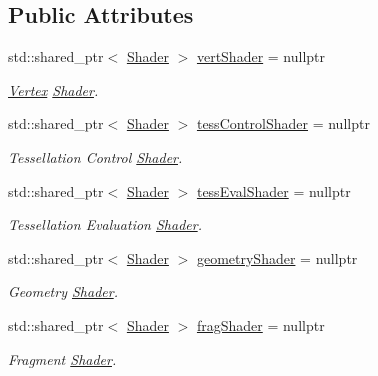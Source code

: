 \subsection*{Public Attributes}
\begin{DoxyCompactItemize}
\item 
\mbox{\label{struct_shader_set_a42e4d7883cc499b15fb6f9d93ec1ab30}} 
std\+::shared\+\_\+ptr$<$ \mbox{\hyperlink{class_shader}{Shader}} $>$ \mbox{\hyperlink{struct_shader_set_a42e4d7883cc499b15fb6f9d93ec1ab30}{vert\+Shader}} = nullptr
\begin{DoxyCompactList}\small\item\em \mbox{\hyperlink{struct_vertex}{Vertex}} \mbox{\hyperlink{class_shader}{Shader}}. \end{DoxyCompactList}\item 
\mbox{\label{struct_shader_set_ac92117d329dc06bc90c1d540dcbc9251}} 
std\+::shared\+\_\+ptr$<$ \mbox{\hyperlink{class_shader}{Shader}} $>$ \mbox{\hyperlink{struct_shader_set_ac92117d329dc06bc90c1d540dcbc9251}{tess\+Control\+Shader}} = nullptr
\begin{DoxyCompactList}\small\item\em Tessellation Control \mbox{\hyperlink{class_shader}{Shader}}. \end{DoxyCompactList}\item 
\mbox{\label{struct_shader_set_af05a7762f410cdc3faf5b443b1b4d74a}} 
std\+::shared\+\_\+ptr$<$ \mbox{\hyperlink{class_shader}{Shader}} $>$ \mbox{\hyperlink{struct_shader_set_af05a7762f410cdc3faf5b443b1b4d74a}{tess\+Eval\+Shader}} = nullptr
\begin{DoxyCompactList}\small\item\em Tessellation Evaluation \mbox{\hyperlink{class_shader}{Shader}}. \end{DoxyCompactList}\item 
\mbox{\label{struct_shader_set_a7cbdaf9695066834067d6c4d5699f52c}} 
std\+::shared\+\_\+ptr$<$ \mbox{\hyperlink{class_shader}{Shader}} $>$ \mbox{\hyperlink{struct_shader_set_a7cbdaf9695066834067d6c4d5699f52c}{geometry\+Shader}} = nullptr
\begin{DoxyCompactList}\small\item\em Geometry \mbox{\hyperlink{class_shader}{Shader}}. \end{DoxyCompactList}\item 
\mbox{\label{struct_shader_set_afe66532212e734ef5b53783976d29241}} 
std\+::shared\+\_\+ptr$<$ \mbox{\hyperlink{class_shader}{Shader}} $>$ \mbox{\hyperlink{struct_shader_set_afe66532212e734ef5b53783976d29241}{frag\+Shader}} = nullptr
\begin{DoxyCompactList}\small\item\em Fragment \mbox{\hyperlink{class_shader}{Shader}}. \end{DoxyCompactList}\end{DoxyCompactItemize}


